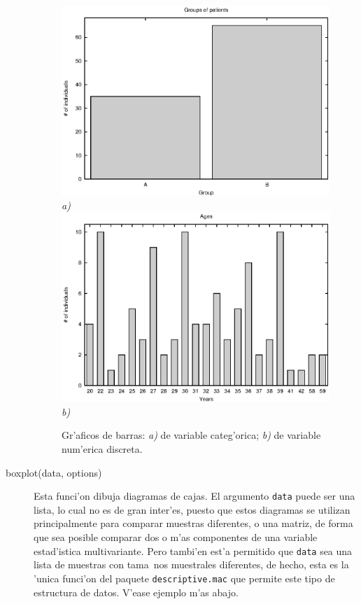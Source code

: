 \documentclass[spanish,12pt,a4paper]{article}
\begin{document}
\begin{description}
\begin{figure}
\begin{center}
\includegraphics[scale=1.0]{barsplot1.eps} \\
\emph{a)} \\ 
\includegraphics[scale=1.0]{barsplot2.eps} \\
\emph{b)} \\
\caption{Gr'aficos de barras: \emph{a)} de variable categ'orica; \emph{b)} de variable num'erica discreta.}
\label{fig5}
\end{center}
\end{figure}


\item[boxplot(data, options)] Esta funci'on dibuja diagramas de cajas. El argumento \verb|data| puede ser una lista, lo cual no es de gran inter'es, puesto que estos diagramas se utilizan principalmente para comparar muestras diferentes, o una matriz, de forma que sea posible comparar dos o m'as componentes de una variable estad'istica multivariante. Pero tambi'en est'a permitido que \verb|data| sea una lista de muestras con tama~nos muestrales diferentes, de hecho, esta es la 'unica funci'on del paquete \verb|descriptive.mac| que permite este tipo de estructura de datos. V'ease ejemplo m'as abajo.


\end{description}
\end{document}
